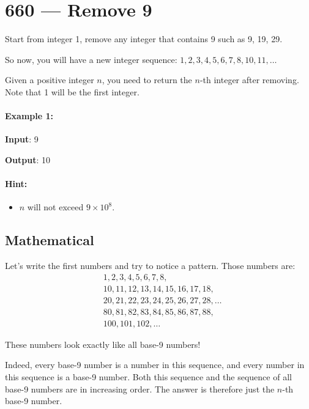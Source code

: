 \section{660 --- Remove 9}
Start from integer 1, remove any integer that contains 9 such as 9, 19, 29.

So now, you will have a new integer sequence: $1, 2, 3, 4, 5, 6, 7, 8, 10, 11, \ldots$

Given a positive integer $n$, you need to return the $n$-th integer after removing. Note that 1 will be the first integer.

\paragraph{Example 1:}
\begin{flushleft}
\textbf{Input}: 9

\textbf{Output}: 10
\end{flushleft}

\paragraph{Hint:}
\begin{itemize}
    \item $n$ will not exceed $9 \times 10^8$.
\end{itemize}

\subsection{Mathematical}
Let's write the first numbers and try to notice a pattern. Those numbers are:
\begin{align*}
& 1, 2, 3, 4, 5, 6, 7, 8, \\
& 10, 11, 12, 13, 14, 15, 16, 17, 18,\\
& 20, 21, 22, 23, 24, 25, 26, 27, 28, \ldots \\
& 80, 81, 82, 83, 84, 85, 86, 87, 88, \\
& 100, 101, 102, \ldots
\end{align*}

These numbers look exactly like all base-9 numbers!

Indeed, every base-9 number is a number in this sequence, and every number in this sequence is a base-9 number. Both this sequence and the sequence of all base-9 numbers are in increasing order. The answer is therefore just the $n$-th base-9 number.


